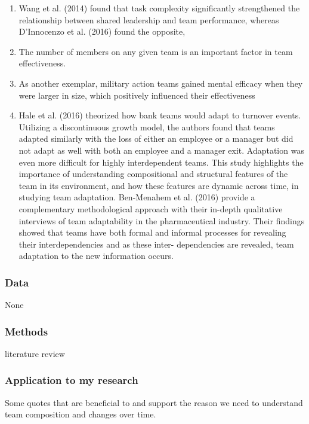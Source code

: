 \documentclass[12pt]{article}
\begin{document}
\begin{enumerate}
    \item Wang et al. (2014) found that task complexity significantly strengthened the relationship between shared leadership and team performance, whereas D’Innocenzo et al. (2016) found the opposite,
    \item The number of members on any given team is an important factor in team effectiveness.
    \item As another exemplar, military action teams gained mental efficacy when they were larger in size, which positively influenced their effectiveness
    \item Hale et al. (2016) theorized how bank teams would adapt to turnover events. Utilizing a discontinuous growth model, the authors found that teams adapted similarly with the loss of either an employee or a manager but did not adapt as well with both an employee and a manager exit. Adaptation was even more difficult for highly interdependent teams. This study highlights the importance of understanding compositional and structural features of the team in its environment, and how these features are dynamic across time, in studying team adaptation. Ben-Menahem et al. (2016) provide a complementary methodological approach with their in-depth qualitative interviews of team adaptability in the pharmaceutical industry. Their findings showed that teams have both formal and informal processes for revealing their interdependencies and as these inter- dependencies are revealed, team adaptation to the new information occurs.
\end{enumerate}

\subsubsection*{Data}

None

\subsubsection*{Methods}

literature review

\subsubsection*{Application to my research}

Some quotes that are beneficial to and support the reason we need to understand team composition and changes over time.
\end{document}
